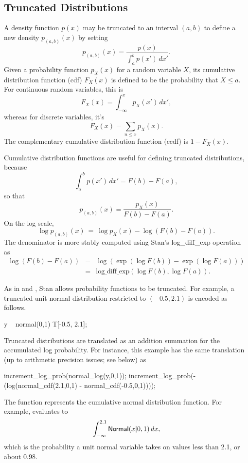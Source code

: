\subsection{Truncated Distributions}

A density function $p(x)$ may be truncated to an interval $(a,b)$ to
define a new density $p_{(a,b)}\!(x)$ by setting
%
\[
p_{\!(a,b)\!}(x) = \frac{p(x)}
                  {\int_a^b p(x') \, dx'}.
\]
Given a probability function $p_X(x)$ for a random variable $X$, its
cumulative distribution function (cdf) $F_X(x)$ is defined to be the
probability that $X \leq a$.  For continuous random variables, this is
\[
F_X(x) = \int_{-\infty}^{x} p_X(x') \, dx',
\]
whereas for discrete variables, it's
\[
F_X(x) = \sum_{n \leq x} p_X(x).
\]
%
The complementary cumulative distribution function (ccdf) is $1 -
F_X(x)$.

Cumulative distribution functions are useful for defining truncated
distributions, because
\[
\int_a^b p(x') \, dx' = F(b) - F(a),
\]
so that
\[
p_{\!(a,b)\!}(x) = \frac{p_X(x)}
                  {F(b) - F(a)}.
\]
On the log scale,
\[
\log p_{\!(a,b)\!}(x)
\ = \
\log p_X(x)
- \log \left( F(b) - F(a) \right).
\]
The denominator is more stably computed using Stan's
log\_diff\_exp operation as
\begin{eqnarray*}
\log \left( F(b) - F(a) \right)
& = & \log \left( \exp(\log F(b)) - \exp(\log F(a)) \right)
\\[6pt]
& = & \mbox{log\_diff\_exp}\!\left( \log F(b), \log F(a) \right).
\end{eqnarray*}



As in \BUGS and \JAGS, Stan allows probability functions to be
truncated.  For example, a truncated unit normal distribution
restricted to $(-0.5, 2.1)$ is encoded as follows.
%
\begin{stancode}
y ~ normal(0,1) T[-0.5, 2.1];
\end{stancode}
%
Truncated distributions are translated as an addition summation for
the accumulated log probability.  For instance, this example has the
same translation (up to arithmetic precision issues; see below) as
%
\begin{stancode}
increment_log_prob(normal_log(y,0,1));
increment_log_prob(-(log(normal_cdf(2.1,0,1)
                         - normal_cdf(-0.5,0,1))));
\end{stancode}
%
The function  represents the cumulative normal
distribution function.  For example, \code{normal\_cdf(2.1,0,1)} evaluates to
\[
\int_{-\infty}^{2.1} \mbox{\sf Normal}(x|0,1) \, dx,
\]
%
which is the probability a unit normal variable takes on values less
than 2.1, or about 0.98.


